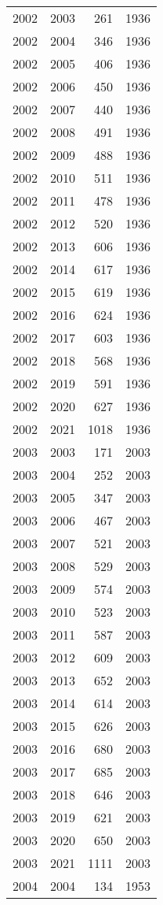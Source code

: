 \documentclass[
  11pt,
  letterpaper,
  DIV=11,
  numbers=noendperiod,
  twoside]{scrartcl}
\begin{document}
\begin{longtable}[]{@{}rrrr@{}}
2002 & 2003 & 261 & 1936 \\
2002 & 2004 & 346 & 1936 \\
2002 & 2005 & 406 & 1936 \\
2002 & 2006 & 450 & 1936 \\
2002 & 2007 & 440 & 1936 \\
2002 & 2008 & 491 & 1936 \\
2002 & 2009 & 488 & 1936 \\
2002 & 2010 & 511 & 1936 \\
2002 & 2011 & 478 & 1936 \\
2002 & 2012 & 520 & 1936 \\
2002 & 2013 & 606 & 1936 \\
2002 & 2014 & 617 & 1936 \\
2002 & 2015 & 619 & 1936 \\
2002 & 2016 & 624 & 1936 \\
2002 & 2017 & 603 & 1936 \\
2002 & 2018 & 568 & 1936 \\
2002 & 2019 & 591 & 1936 \\
2002 & 2020 & 627 & 1936 \\
2002 & 2021 & 1018 & 1936 \\
2003 & 2003 & 171 & 2003 \\
2003 & 2004 & 252 & 2003 \\
2003 & 2005 & 347 & 2003 \\
2003 & 2006 & 467 & 2003 \\
2003 & 2007 & 521 & 2003 \\
2003 & 2008 & 529 & 2003 \\
2003 & 2009 & 574 & 2003 \\
2003 & 2010 & 523 & 2003 \\
2003 & 2011 & 587 & 2003 \\
2003 & 2012 & 609 & 2003 \\
2003 & 2013 & 652 & 2003 \\
2003 & 2014 & 614 & 2003 \\
2003 & 2015 & 626 & 2003 \\
2003 & 2016 & 680 & 2003 \\
2003 & 2017 & 685 & 2003 \\
2003 & 2018 & 646 & 2003 \\
2003 & 2019 & 621 & 2003 \\
2003 & 2020 & 650 & 2003 \\
2003 & 2021 & 1111 & 2003 \\
2004 & 2004 & 134 & 1953 \\

\end{longtable}
\end{document}
